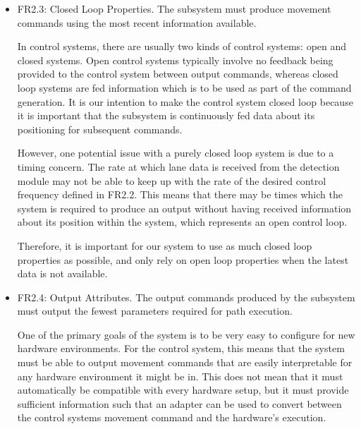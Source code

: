 \documentclass[titlepage]{article}
\begin{document}
{\begin{itemize}
	      An important part of any real-time control system is that it must be able to reach deadlines. Additionally, a control system must exhibit continuous interaction with the environment which it is located within. To achieve these goals, the system must therefore be required to produce periodic movement commands that are frequent enough to give the appearance of continuous motion. The frequency of 50Hz was agreed upon by the group and the project supervisors as sufficiently frequent to represent continuous feedback from the control system.

	\item FR2.3: Closed Loop Properties.
	      The subsystem must produce movement commands using the most recent information available.

	      In control systems, there are usually two kinds of control systems: open and closed systems. Open control systems typically involve no feedback being provided to the control system between output commands, whereas closed loop systems are fed information which is to be used as part of the command generation. It is our intention to make the control system closed loop because it is important that the subsystem is continuously fed data about its positioning for subsequent commands.

	      However, one potential issue with a purely closed loop system is due to a timing concern. The rate at which lane data is received from the detection module may not be able to keep up with the rate of the desired control frequency defined in FR2.2. This means that there may be times which the system is required to produce an output without having received information about its position within the system, which represents an open control loop.

	      Therefore, it is important for our system to use as much closed loop properties as possible, and only rely on open loop properties when the latest data is not available.

	\item FR2.4: Output Attributes. The output commands produced by the subsystem must output the fewest parameters required for path execution.

	      One of the primary goals of the system is to be very easy to configure for new hardware environments. For the control system, this means that the system must be able to output movement commands that are easily interpretable for any hardware environment it might be in. This does not mean that it must automatically be compatible with every hardware setup, but it must provide sufficient information such that an adapter can be used to convert between the control systems movement command and the hardware's execution.
\end{itemize}


}
\end{document}
